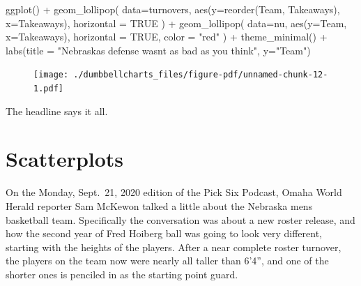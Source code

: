 \documentclass[
  letterpaper,
  DIV=11,
  numbers=noendperiod]{scrreprt}
\newenvironment{Shaded}{\begin{snugshade}}{\end{snugshade}}
\newcommand{\AttributeTok}[1]{\textcolor[rgb]{0.40,0.45,0.13}{#1}}
\newcommand{\ConstantTok}[1]{\textcolor[rgb]{0.56,0.35,0.01}{#1}}
\newcommand{\FunctionTok}[1]{\textcolor[rgb]{0.28,0.35,0.67}{#1}}
\newcommand{\NormalTok}[1]{\textcolor[rgb]{0.00,0.23,0.31}{#1}}
\newcommand{\SpecialCharTok}[1]{\textcolor[rgb]{0.37,0.37,0.37}{#1}}
\newcommand{\StringTok}[1]{\textcolor[rgb]{0.13,0.47,0.30}{#1}}
\begin{document}
\begin{Shaded}
\begin{Highlighting}[]
\FunctionTok{ggplot}\NormalTok{() }\SpecialCharTok{+} 
  \FunctionTok{geom\_lollipop}\NormalTok{(}
    \AttributeTok{data=}\NormalTok{turnovers, }
    \FunctionTok{aes}\NormalTok{(}\AttributeTok{y=}\FunctionTok{reorder}\NormalTok{(Team, Takeaways), }\AttributeTok{x=}\NormalTok{Takeaways), }
    \AttributeTok{horizontal =} \ConstantTok{TRUE}
\NormalTok{    ) }\SpecialCharTok{+} 
  \FunctionTok{geom\_lollipop}\NormalTok{(}
    \AttributeTok{data=}\NormalTok{nu,}
    \FunctionTok{aes}\NormalTok{(}\AttributeTok{y=}\NormalTok{Team, }\AttributeTok{x=}\NormalTok{Takeaways),}
    \AttributeTok{horizontal =} \ConstantTok{TRUE}\NormalTok{,}
    \AttributeTok{color =} \StringTok{"red"}
\NormalTok{  ) }\SpecialCharTok{+} 
  \FunctionTok{theme\_minimal}\NormalTok{() }\SpecialCharTok{+} 
  \FunctionTok{labs}\NormalTok{(}\AttributeTok{title =} \StringTok{"Nebraska\textquotesingle{}s defense wasn\textquotesingle{}t as bad as you think"}\NormalTok{, }\AttributeTok{y=}\StringTok{"Team"}\NormalTok{)}
\end{Highlighting}
\end{Shaded}

\begin{figure}[H]

{\centering \texttt{[image: ./dumbbellcharts\_files/figure-pdf/unnamed-chunk-12-1.pdf]}

}

\end{figure}

The headline says it all.


\hypertarget{scatterplots}{%
\chapter{Scatterplots}\label{scatterplots}}

On the Monday, Sept.~21, 2020 edition of the Pick Six Podcast, Omaha
World Herald reporter Sam McKewon talked a little about the Nebraska
mens basketball team. Specifically the conversation was about a new
roster release, and how the second year of Fred Hoiberg ball was going
to look very different, starting with the heights of the players. After
a near complete roster turnover, the players on the team now were nearly
all taller than 6'4'', and one of the shorter ones is penciled in as the
starting point guard.
\end{document}
